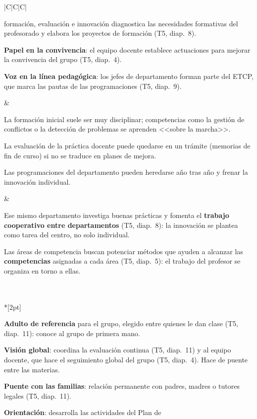 \documentclass[11pt,a4paper]{article}
\newcommand{\figura}[1]{%
  \multicolumn{3}{l}{\cellcolor{acento!8}\textbf{\color{acento}#1}}\\*[2pt]}
\begin{document}
{\begin{longtable}{|C|C|C|}
\begin{pni}
  formación, evaluación e innovación diagnostica las necesidades formativas
  del profesorado y elabora los proyectos de formación (T5, diap.~8).
  \item \textbf{Papel en la convivencia}: el equipo docente establece
  actuaciones para mejorar la convivencia del grupo (T5, diap.~4).
  \item \textbf{Voz en la línea pedagógica}: los jefes de departamento forman
  parte del ETCP, que marca las pautas de las programaciones (T5, diap.~9).
\end{pni}
&
\begin{pni}
  \item La formación inicial suele ser muy disciplinar; competencias como la
  gestión de conflictos o la detección de problemas se aprenden
  <<sobre la marcha>>.
  \item La evaluación de la práctica docente puede quedarse en un trámite
  (memorias de fin de curso) si no se traduce en planes de mejora.
  \item Las programaciones del departamento pueden heredarse año tras año y
  frenar la innovación individual.
\end{pni}
&
\begin{pni}
  \item Ese mismo departamento investiga buenas prácticas y fomenta el
  \textbf{trabajo cooperativo entre departamentos} (T5, diap.~8): la
  innovación se plantea como tarea del centro, no solo individual.
  \item Las áreas de competencia buscan potenciar métodos que ayuden a
  alcanzar las \textbf{competencias} asignadas a cada área (T5, diap.~5): el trabajo
  del profesor se organiza en torno a ellas.
\end{pni}
\\ \hline
\noalign{\vspace{12pt}}
\hline
\figura{Tutor o tutora}
\begin{pni}
  \item \textbf{Adulto de referencia} para el grupo, elegido entre quienes le
  dan clase (T5, diap.~11): conoce al grupo de primera mano.
  \item \textbf{Visión global}: coordina la evaluación continua (T5,
  diap.~11) y al equipo docente, que hace el seguimiento global del grupo
  (T5, diap.~4). Hace de puente entre las materias.
  \item \textbf{Puente con las familias}: relación permanente con padres,
  madres o tutores legales (T5, diap.~11).
  \item \textbf{Orientación}: desarrolla las actividades del Plan de

\end{pni}
\end{longtable}}
\end{document}
